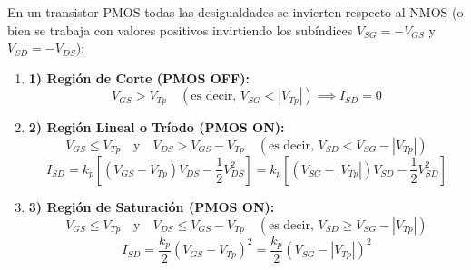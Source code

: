 \begin{ley}
En un transistor PMOS todas las desigualdades se invierten respecto al NMOS (o bien se trabaja con valores positivos invirtiendo los subíndices $V_{SG} = -V_{GS}$ y $V_{SD} = -V_{DS}$):
\begin{enumerate}[leftmargin=*]
    \item \textbf{1) Región de Corte (PMOS OFF):}
    \begin{equation}
        V_{GS} > V_{Tp} \quad (\text{es decir, } V_{SG} < |V_{Tp}|) \implies I_{SD} = 0
    \end{equation}
    \item \textbf{2) Región Lineal o Tríodo (PMOS ON):}
    \begin{equation}
        V_{GS} \le V_{Tp} \quad \text{y} \quad V_{DS} > V_{GS} - V_{Tp} \quad \left(\text{es decir, } V_{SD} < V_{SG} - |V_{Tp}|\right)
    \end{equation}
    \begin{equation}
        I_{SD} = k_p \left[ (V_{GS} - V_{Tp}) V_{DS} - \frac{1}{2} V_{DS}^2 \right] = k_p \left[ (V_{SG} - |V_{Tp}|) V_{SD} - \frac{1}{2} V_{SD}^2 \right]
    \end{equation}
    \item \textbf{3) Región de Saturación (PMOS ON):}
    \begin{equation}
        V_{GS} \le V_{Tp} \quad \text{y} \quad V_{DS} \le V_{GS} - V_{Tp} \quad \left(\text{es decir, } V_{SD} \ge V_{SG} - |V_{Tp}|\right)
    \end{equation}
    \begin{equation}
        I_{SD} = \frac{k_p}{2} (V_{GS} - V_{Tp})^2 = \frac{k_p}{2} (V_{SG} - |V_{Tp}|)^2
    \end{equation}
\end{enumerate}
\end{ley}

